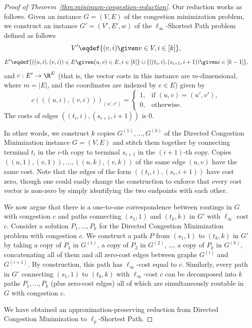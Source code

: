 \documentclass[11pt,a4paper]{article}
\begin{document}
\begin{proof}[Proof of Theorem~\ref{thm:minimum-congestion-reduction}]
Our reduction works as follows. Given an instance $G=(V,E)$ of the congestion minimization problem, we construct an instance $G'=(V',E',w)$ of the $\ell_\infty$-Shortest Path problem defined as follows
    \[
        V'\eqdef\{(v,i) \given v \in V, i\in [k]\}, 
    \]
    \[
        E'\eqdef \{((u,i),(v,i))\in E \given (u,v)\in E, i\in [k]\} \cup\{ ((t_i,i),(s_{i+1},{i+1}))\given i \in [k-1]\},
    \]
    and $c : E' \to \R^E$ (that is, the vector costs in this instance are $m$-dimensional, where $m = |E|$, and the coordinates are indexed by $e\in E$) given by
    \[
        c(((u,i),(v,i)))_{(u',v')} = \begin{cases}
            1, & \text{if }  (u,v) = (u',v'),\\
            0, & \text{otherwise.}
        \end{cases}
    \]
    The costs of edges $((t_i,i),(s_{i+1},{i+1}))$ is 0.
    
    In other words, we construct $k$ copies $G^{(1)}, \dots , G^{(k)}$ of the Directed Congestion Minimization instance $G=(V,E)$ and stitch them together by connecting terminal $t_i$ in the $i$-{th} copy to terminal $s_{i+1}$ in the $(i+1)$-{th} copy. Copies $((u,1),(v,1)),\dots,((u,k), (v,k))$ of the same edge $(u,v)$ have the same cost. Note that the edges of the form $((t_i,i),(s_i,i+1))$ have cost zero, though one could easily change the construction to enforce that every cost vector is non-zero by simply identifying the two endpoints with each other.

    We now argue that there is a one-to-one correspondence between routings in $G$ with congestion $c$ and paths connecting $(s_1,1)$ and $(t_k,k)$ in $G'$ with $\ell_\infty$ cost $c$. Consider a solution $P_1,\dots,P_k$ for the Directed Congestion Minimization problem with congestion $c$. We construct a path $P$ from $(s_1,1)$ to $(t_k,k)$ in $G'$ by taking a copy of $P_1$ in $G^{(1)}$, a copy of $P_2$ in $G^{(2)}$, \dots, a copy of $P_k$ in $G^{(k)}$, concatenating all of them and all zero-cost edges between graphs $G^{(i)}$ and $G^{(i+1)}$. By construction, this path has $\ell_\infty$-cost equal to $c$. Similarly, every path in $G'$ connecting $(s_1,1)$ to $(t_k,k)$ with $\ell_\infty$-cost $c$ can be decomposed into $k$ paths $P_1, \dots, P_k$ (plus zero-cost edges) all of which are simultaneously routable in $G$ with congestion $c$.

    We have obtained an approximation-preserving reduction from Directed Congestion Minimization to $\ell_p$-Shortest Path.
\end{proof}
\end{document}
